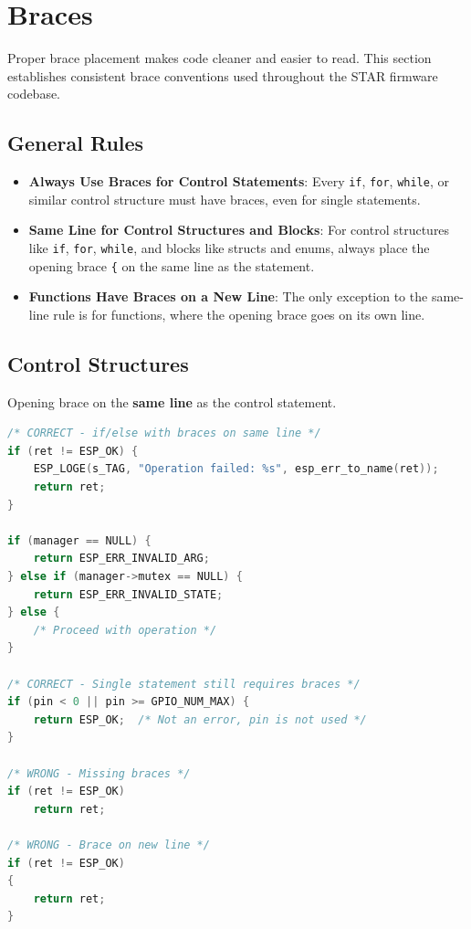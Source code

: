 \section{Braces}

Proper brace placement makes code cleaner and easier to read. This section establishes consistent brace conventions used throughout the STAR firmware codebase.

\subsection{General Rules}

\begin{itemize}
    \item \textbf{Always Use Braces for Control Statements}: Every \texttt{if}, \texttt{for}, \texttt{while}, or similar control structure must have braces, even for single statements.
    \item \textbf{Same Line for Control Structures and Blocks}: For control structures like \texttt{if}, \texttt{for}, \texttt{while}, and blocks like structs and enums, always place the opening brace \texttt{\{} on the same line as the statement.
    \item \textbf{Functions Have Braces on a New Line}: The only exception to the same-line rule is for functions, where the opening brace goes on its own line.
\end{itemize}

\subsection{Control Structures}

Opening brace on the \textbf{same line} as the control statement.

\begin{lstlisting}[language=C]
/* CORRECT - if/else with braces on same line */
if (ret != ESP_OK) {
    ESP_LOGE(s_TAG, "Operation failed: %s", esp_err_to_name(ret));
    return ret;
}

if (manager == NULL) {
    return ESP_ERR_INVALID_ARG;
} else if (manager->mutex == NULL) {
    return ESP_ERR_INVALID_STATE;
} else {
    /* Proceed with operation */
}

/* CORRECT - Single statement still requires braces */
if (pin < 0 || pin >= GPIO_NUM_MAX) {
    return ESP_OK;  /* Not an error, pin is not used */
}

/* WRONG - Missing braces */
if (ret != ESP_OK)
    return ret;

/* WRONG - Brace on new line */
if (ret != ESP_OK)
{
    return ret;
}
\end{lstlisting}

